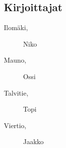 \subsection*{Kirjoittajat}
\begin{description}
\item[Ilomäki, ] Niko
\item[Mauno, ] Ossi
\item[Talvitie, ] Topi
\item[Viertio, ] Jaakko
\end{description}
